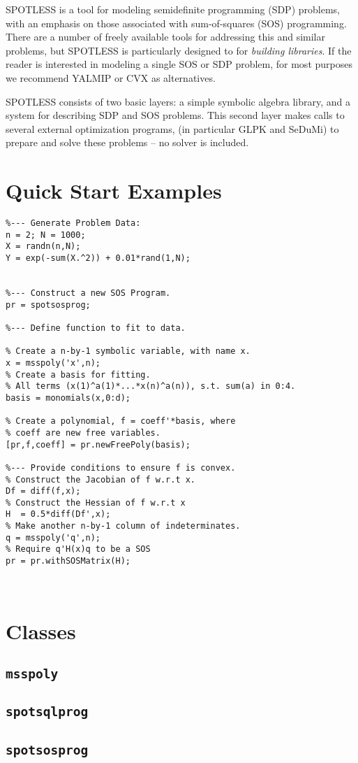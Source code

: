 \documentclass{article}
\title{\spotless}
\author{Mark M. Tobenkin, Alexandre Megretski}
\newcommand{\spotless}{SPOT{\small LESS} }
\begin{document}
\maketitle

\spotless is a tool for modeling semidefinite programming (SDP) problems, with an emphasis on those associated with sum-of-squares (SOS) programming.  There are a number of freely available tools for addressing this and similar problems, but \spotless is particularly designed to for {\it building libraries}.
If the reader is interested in modeling a single SOS or SDP problem, for most purposes we recommend YALMIP or CVX as alternatives.

\spotless consists of two basic layers: a simple symbolic algebra library, and a system for describing SDP and SOS problems.
This second layer makes calls to several external optimization programs, (in particular GLPK and SeDuMi) to prepare and solve these problems -- no solver is included.
\section{Quick Start Examples}

\begin{lstlisting}
%--- Generate Problem Data:
n = 2; N = 1000;
X = randn(n,N);
Y = exp(-sum(X.^2)) + 0.01*rand(1,N);


%--- Construct a new SOS Program.
pr = spotsosprog;

%--- Define function to fit to data.

% Create a n-by-1 symbolic variable, with name x.
x = msspoly('x',n);
% Create a basis for fitting.
% All terms (x(1)^a(1)*...*x(n)^a(n)), s.t. sum(a) in 0:4.
basis = monomials(x,0:d);

% Create a polynomial, f = coeff'*basis, where
% coeff are new free variables.
[pr,f,coeff] = pr.newFreePoly(basis);

%--- Provide conditions to ensure f is convex.
% Construct the Jacobian of f w.r.t x.
Df = diff(f,x);
% Construct the Hessian of f w.r.t x 
H  = 0.5*diff(Df',x);
% Make another n-by-1 column of indeterminates.
q = msspoly('q',n);
% Require q'H(x)q to be a SOS 
pr = pr.withSOSMatrix(H);



\end{lstlisting}

\section{Classes}
\subsection{{\lstinline{msspoly}}}
\subsection{{\lstinline{spotsqlprog}}}
\subsection{{\lstinline{spotsosprog}}}
\end{document}
